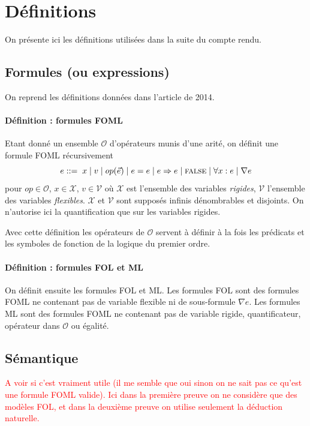 \documentclass[12pt]{article}
\newcommand{\raph}[1]{\textcolor{red}{#1}}
\newcommand{\FALSE}{\textsc{false}}
\begin{document}
\section{Définitions}

On présente ici les définitions utilisées dans la suite du compte rendu.

\subsection{Formules (ou expressions)}

On reprend les définitions données dans l'article de 2014.

\paragraph{Définition : formules FOML}
Etant donné un ensemble $\mathcal{O}$ d'opérateurs munis d'une arité, on définit une formule FOML récursivement
\[ e ::= \; x \; | \; v \; | \; op(\vec{e}) \; | \; e = e
  \; | \; e \Rightarrow e \; | \; \FALSE \; | \; \forall x : e \; | \; \nabla e \]
pour $op \in \mathcal{O}$, $x \in \mathcal{X}$, $v \in \mathcal{V}$ où $\mathcal{X}$ est l'ensemble des variables \emph{rigides}, $\mathcal{V}$ l'ensemble des variables \emph{flexibles}. $\mathcal{X}$ et $\mathcal{V}$ sont supposés infinis dénombrables et disjoints.
On n'autorise ici la quantification que sur les variables rigides.

Avec cette définition les opérateurs de $\mathcal{O}$ servent à définir à la fois les prédicats et les symboles de fonction de la logique du premier ordre.


\paragraph{Définition : formules FOL et ML}
On définit ensuite les formules FOL et ML.
Les formules FOL sont des formules FOML ne contenant pas de variable flexible ni de sous-formule $\nabla e$.
Les formules ML sont des formules FOML ne contenant pas de variable rigide, quantificateur, opérateur dans $\mathcal{O}$ ou égalité.

\subsection{Sémantique}

\raph{A voir si c'est vraiment utile (il me semble que oui sinon on ne sait pas ce qu'est une formule FOML valide).
  Ici dans la première preuve on ne considère que des modèles FOL, et dans la deuxième preuve on utilise seulement la déduction naturelle.}
\end{document}
